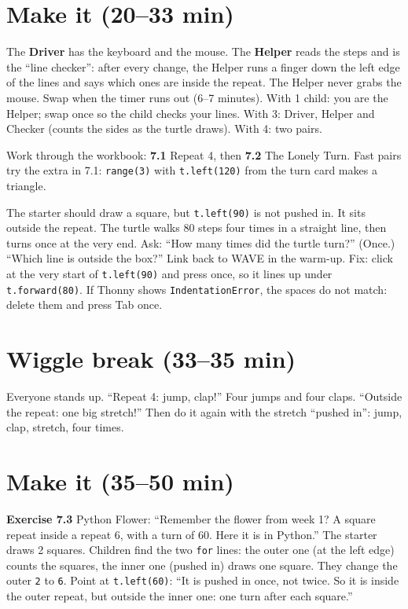 \section{Make it (20--33 min)}
\begin{pairroles}
The \textbf{Driver} has the keyboard and the mouse. The \textbf{Helper} reads the steps and is the \enquote{line checker}: after every change, the Helper runs a finger down the left edge of the lines and says which ones are inside the repeat. The Helper never grabs the mouse. Swap when the timer runs out (6--7 minutes). With 1 child: you are the Helper; swap once so the child checks your lines. With 3: Driver, Helper and Checker (counts the sides as the turtle draws). With 4: two pairs.
\end{pairroles}

Work through the workbook: \textbf{7.1} Repeat 4, then \textbf{7.2} The Lonely Turn. Fast pairs try the extra in 7.1: \texttt{range(3)} with \texttt{t.left(120)} from the turn card makes a triangle.

\begin{bughunt}
The starter should draw a square, but \texttt{t.left(90)} is not pushed in. It sits outside the repeat. The turtle walks 80 steps four times in a straight line, then turns once at the very end. Ask: \enquote{How many times did the turtle turn?} (Once.) \enquote{Which line is outside the box?} Link back to WAVE in the warm-up. Fix: click at the very start of \texttt{t.left(90)} and press  once, so it lines up under \texttt{t.forward(80)}. If Thonny shows \texttt{IndentationError}, the spaces do not match: delete them and press Tab once.
\end{bughunt}

\section{Wiggle break (33--35 min)}
Everyone stands up. \enquote{Repeat 4: jump, clap!} Four jumps and four claps. \enquote{Outside the repeat: one big stretch!} Then do it again with the stretch \enquote{pushed in}: jump, clap, stretch, four times.

\section{Make it (35--50 min)}
\textbf{Exercise 7.3} Python Flower: \enquote{Remember the flower from week 1? A square repeat inside a repeat 6, with a turn of 60. Here it is in Python.} The starter draws 2 squares. Children find the two \texttt{for} lines: the outer one (at the left edge) counts the squares, the inner one (pushed in) draws one square. They change the outer \texttt{2} to \texttt{6}. Point at \texttt{t.left(60)}: \enquote{It is pushed in once, not twice. So it is inside the outer repeat, but outside the inner one: one turn after each square.}


